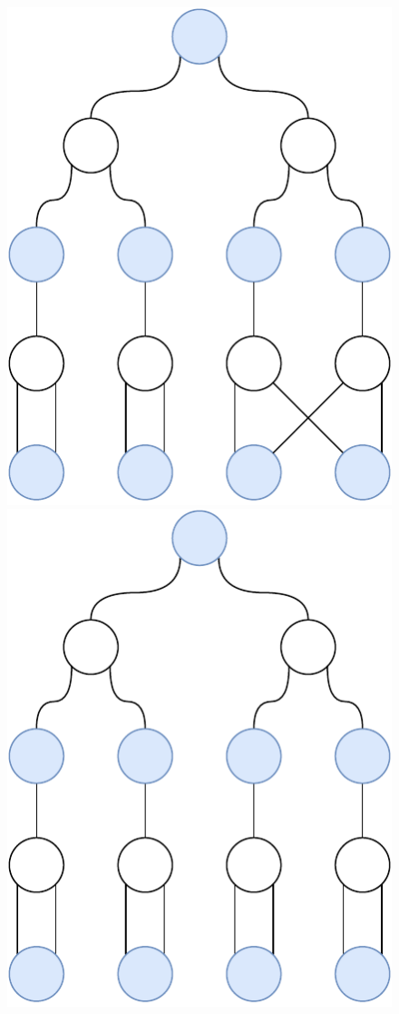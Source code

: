 \begin{figure}[H]
{    }
    \hfill
       {
      \centering
      \includegraphics[scale=0.35]{diagrams/results_multigraph_n15_5.pdf}
    }
    \hfill
       {
      \centering
      \includegraphics[scale=0.35]{diagrams/results_multigraph_n15_9.pdf}
}
\end{figure}
